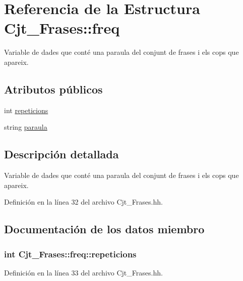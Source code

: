 \hypertarget{struct_cjt___frases_1_1freq}{}\section{Referencia de la Estructura Cjt\+\_\+\+Frases\+:\+:freq}
\label{struct_cjt___frases_1_1freq}


Variable de dades que conté una paraula del conjunt de frases i els cops que apareix.  


\subsection*{Atributos públicos}
\begin{DoxyCompactItemize}
\item 
int \hyperlink{struct_cjt___frases_1_1freq_a23048761d7782764594a187dc02f9db5}{repeticions}
\item 
string \hyperlink{struct_cjt___frases_1_1freq_a82c8d32210892aa8888dcbec44c2785f}{paraula}
\end{DoxyCompactItemize}


\subsection{Descripción detallada}
Variable de dades que conté una paraula del conjunt de frases i els cops que apareix. 

Definición en la línea 32 del archivo Cjt\+\_\+\+Frases.\+hh.



\subsection{Documentación de los datos miembro}
\subsubsection[{\texorpdfstring{repeticions}{repeticions}}]{\setlength{\rightskip}{0pt plus 5cm}int Cjt\+\_\+\+Frases\+::freq\+::repeticions}\hypertarget{struct_cjt___frases_1_1freq_a23048761d7782764594a187dc02f9db5}{}\label{struct_cjt___frases_1_1freq_a23048761d7782764594a187dc02f9db5}


Definición en la línea 33 del archivo Cjt\+\_\+\+Frases.\+hh.

